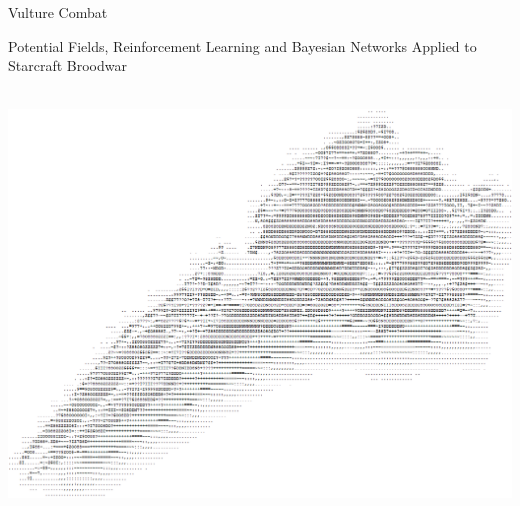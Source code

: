\thispagestyle{empty}
\begin{center}
	\Huge
	Vulture Combat
	
	\Large
	Potential Fields, Reinforcement Learning and Bayesian Networks Applied to Starcraft Broodwar
	
	\vspace*{1.5in}~\\
	\hspace*{-1in}
    \includegraphics[scale=0.60]{Figures/FrontPage/FrontPage.png}
			
\end{center}



